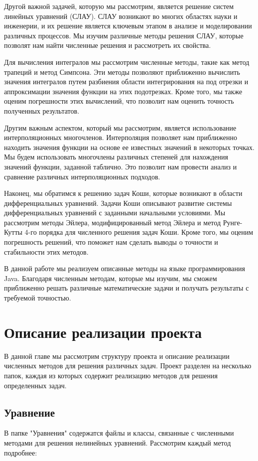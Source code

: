 \documentclass[12pt]{article}
\begin{document}
Другой важной задачей, которую мы рассмотрим, является решение систем линейных уравнений (СЛАУ). СЛАУ возникают во многих областях науки и инженерии, и их решение является ключевым этапом в анализе и моделировании различных процессов. Мы изучим различные методы решения СЛАУ, которые позволят нам найти численные решения и рассмотреть их свойства.

Для вычисления интегралов мы рассмотрим численные методы, такие как метод трапеций и метод Симпсона. Эти методы позволяют приближенно вычислить значения интегралов путем разбиения области интегрирования на под отрезки и аппроксимации значения функции на этих подотрезках. Кроме того, мы также оценим погрешности этих вычислений, что позволит нам оценить точность полученных результатов.

Другим важным аспектом, который мы рассмотрим, является использование интерполяционных многочленов. Интерполяция позволяет нам приближенно находить значения функции на основе ее известных значений в некоторых точках. Мы будем использовать многочлены различных степеней для нахождения значений функции, заданной таблично. Это позволит нам провести анализ и сравнение различных интерполяционных подходов.

Наконец, мы обратимся к решению задач Коши, которые возникают в области дифференциальных уравнений. Задачи Коши описывают развитие системы дифференциальных уравнений с заданными начальными условиями. Мы рассмотрим методы Эйлера, модифицированный метод Эйлера и метод Рунге-Кутты 4-го порядка для численного решения задач Коши. Кроме того, мы оценим погрешность решений, что поможет нам сделать выводы о точности и стабильности этих методов.

В данной работе мы реализуем описанные методы на языке программирования Java. Благодаря численным методам, которые мы изучим, мы сможем приближенно решать различные математические задачи и получать результаты с требуемой точностью.

\newpage

\section{Описание реализации проекта}
В данной главе мы рассмотрим структуру проекта и описание реализации численных методов для решения различных задач. Проект разделен на несколько папок, каждая из которых содержит реализацию методов для решения определенных задач.

\subsection{Уравнение}
В папке "Уравнения" содержатся файлы и классы, связанные с численными методами для решения нелинейных уравнений. Рассмотрим каждый метод подробнее:
\end{document}
